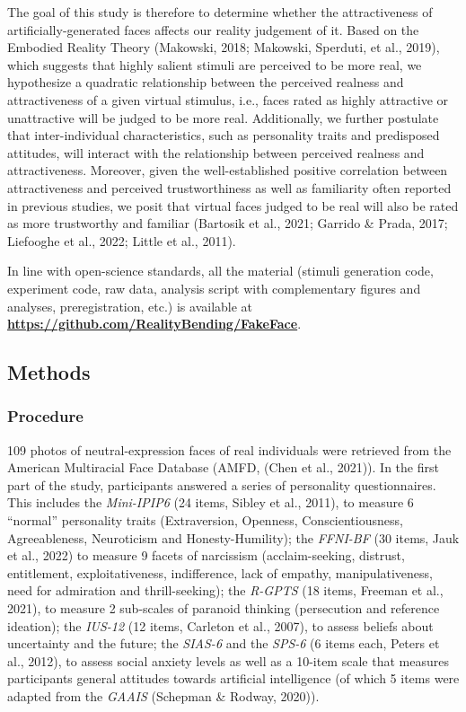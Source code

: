\documentclass[
  man,floatsintext]{apa6}
\begin{document}
The goal of this study is therefore to determine whether the attractiveness of artificially-generated faces affects our reality judgement of it. Based on the Embodied Reality Theory (Makowski, 2018; Makowski, Sperduti, et al., 2019), which suggests that highly salient stimuli are perceived to be more real, we hypothesize a quadratic relationship between the perceived realness and attractiveness of a given virtual stimulus, i.e., faces rated as highly attractive or unattractive will be judged to be more real. Additionally, we further postulate that inter-individual characteristics, such as personality traits and predisposed attitudes, will interact with the relationship between perceived realness and attractiveness. Moreover, given the well-established positive correlation between attractiveness and perceived trustworthiness as well as familiarity often reported in previous studies, we posit that virtual faces judged to be real will also be rated as more trustworthy and familiar (Bartosik et al., 2021; Garrido \& Prada, 2017; Liefooghe et al., 2022; Little et al., 2011).

In line with open-science standards, all the material (stimuli generation code, experiment code, raw data, analysis script with complementary figures and analyses, preregistration, etc.) is available at \href{https://github.com/RealityBending/FakeFace}{\textbf{https://github.com/RealityBending/FakeFace}}.

\hypertarget{methods}{%
\subsection{Methods}\label{methods}}

\hypertarget{procedure}{%
\subsubsection{Procedure}\label{procedure}}

109 photos of neutral-expression faces of real individuals were retrieved from the American Multiracial Face Database (AMFD, (Chen et al., 2021)). In the first part of the study, participants answered a series of personality questionnaires. This includes the \emph{Mini-IPIP6} (24 items, Sibley et al., 2011), to measure 6 ``normal'' personality traits (Extraversion, Openness, Conscientiousness, Agreeableness, Neuroticism and Honesty-Humility); the \emph{FFNI-BF} (30 items, Jauk et al., 2022) to measure 9 facets of narcissism (acclaim-seeking, distrust, entitlement, exploitativeness, indifference, lack of empathy, manipulativeness, need for admiration and thrill-seeking); the \emph{R-GPTS} (18 items, Freeman et al., 2021), to measure 2 sub-scales of paranoid thinking (persecution and reference ideation); the \emph{IUS-12} (12 items, Carleton et al., 2007), to assess beliefs about uncertainty and the future; the \emph{SIAS-6} and the \emph{SPS-6} (6 items each, Peters et al., 2012), to assess social anxiety levels as well as a 10-item scale that measures participants general attitudes towards artificial intelligence (of which 5 items were adapted from the \emph{GAAIS} (Schepman \& Rodway, 2020)).
\end{document}
